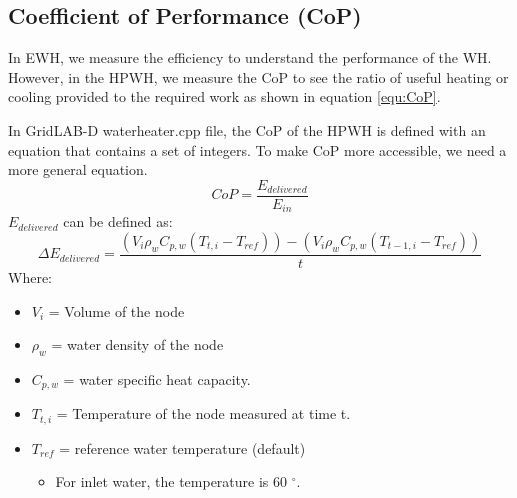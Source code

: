 \subsection{Coefficient of Performance (CoP)}
In EWH, we measure the efficiency to understand the performance of the WH. However, in the HPWH, we measure the CoP to see the ratio of useful heating or cooling provided to the required work as shown in equation \ref{equ:CoP}. \par
In GridLAB-D waterheater.cpp file, the CoP of the HPWH is defined with an equation that contains a set of integers. To make CoP more accessible, we need a more general equation. 
\begin{equation} \label{equ:CoP}
    CoP = \frac{E_{delivered}}{E_{in}}
\end{equation}
$E_{delivered}$ can be defined as:
\begin{equation}\label{equ:E_delivered}
    \Delta E_{delivered} = \frac{(V_{i}\rho_{w}C_{p,w}(T_{t,i}-T_{ref})) - (V_{i}\rho_{w}C_{p,w}(T_{t-1,i} - T_{ref}))}{t}
\end{equation}
Where:
\begin{itemize}
    \item $V_{i}$ = Volume of the node
    \item $\rho_{w}$ = water density of the node
    \item $C_{p,w}$ = water specific heat capacity.
    \item $T_{t,i}$ = Temperature of the node measured at time t.
    \item $T_{ref}$ = reference water temperature (default)
    \begin{itemize}
        \item For inlet water, the temperature is 60 $^{\circ}$.
    \end{itemize}
\end{itemize}
\newpage

